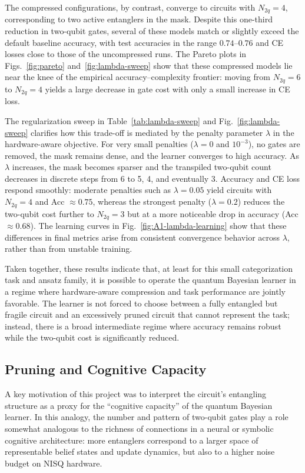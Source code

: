 \documentclass[conference]{IEEEtran}
\begin{document}
The compressed configurations, by contrast, converge to circuits with
$N_{2q}=4$, corresponding to two active entanglers in the mask. Despite this
one-third reduction in two-qubit gates, several of these models match or
slightly exceed the default baseline accuracy, with test accuracies in the
range $0.74$--$0.76$ and CE losses close to those of the uncompressed runs.
The Pareto plots in Figs.~\ref{fig:pareto} and~\ref{fig:lambda-sweep} show that
these compressed models lie near the knee of the empirical
accuracy--complexity frontier: moving from $N_{2q}=6$ to $N_{2q}=4$ yields a
large decrease in gate cost with only a small increase in CE loss.

The regularization sweep in Table~\ref{tab:lambda-sweep} and
Fig.~\ref{fig:lambda-sweep} clarifies how this trade-off is mediated by the
penalty parameter $\lambda$ in the hardware-aware objective. For very small
penalties ($\lambda=0$ and $10^{-3}$), no gates are removed, the mask remains
dense, and the learner converges to high accuracy. As $\lambda$ increases, the
mask becomes sparser and the transpiled two-qubit count decreases in discrete
steps from 6 to 5, 4, and eventually 3. Accuracy and CE loss respond smoothly:
moderate penalties such as $\lambda=0.05$ yield circuits with $N_{2q}=4$ and
Acc $\approx 0.75$, whereas the strongest penalty ($\lambda=0.2$) reduces the
two-qubit cost further to $N_{2q}=3$ but at a more noticeable drop in accuracy
(Acc $\approx 0.68$). The learning curves in Fig.~\ref{fig:A1-lambda-learning}
show that these differences in final metrics arise from consistent
convergence behavior across $\lambda$, rather than from unstable training.

Taken together, these results indicate that, at least for this small
categorization task and ansatz family, it is possible to operate the quantum
Bayesian learner in a regime where hardware-aware compression and task
performance are jointly favorable. The learner is not forced to choose
between a fully entangled but fragile circuit and an excessively pruned
circuit that cannot represent the task; instead, there is a broad intermediate
regime where accuracy remains robust while the two-qubit cost is significantly
reduced.

\subsection{Pruning and Cognitive Capacity}

A key motivation of this project was to interpret the circuit’s entangling
structure as a proxy for the ``cognitive capacity'' of the quantum Bayesian
learner. In this analogy, the number and pattern of two-qubit gates play a
role somewhat analogous to the richness of connections in a neural or symbolic
cognitive architecture: more entanglers correspond to a larger space of
representable belief states and update dynamics, but also to a higher noise
budget on NISQ hardware.
\end{document}

